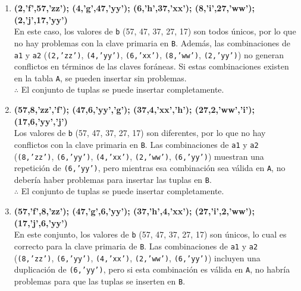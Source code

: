 \begin{enumerate}
    \item \textbf{(2,’f’,57,’zz’); (4,’g’,47,’yy’); (6,’h’,37,’xx’); (8,’i’,27,’ww’); (2,’j’,17,’yy’)} \\
    
    En este caso, los valores de \texttt{b} (57, 47, 37, 27, 17) son todos únicos, por lo que no hay problemas con la clave primaria en \texttt{B}. Además, las combinaciones de \texttt{a1} y \texttt{a2} (\texttt{(2,'zz')}, \texttt{(4,'yy')}, \texttt{(6,'xx')}, \texttt{(8,'ww')}, \texttt{(2,'yy')}) no generan conflictos en términos de las claves foráneas. Si estas combinaciones existen en la tabla \texttt{A}, se pueden insertar sin problemas. \\
    
    $\therefore$ El conjunto de tuplas se puede insertar completamente. \\

    \item \textbf{(57,8,’zz’,’f’); (47,6,’yy’,’g’); (37,4,’xx’,’h’); (27,2,’ww’,’i’); (17,6,’yy’,’j’)} \\
    
    Los valores de \texttt{b} (57, 47, 37, 27, 17) son diferentes, por lo que no hay conflictos con la clave primaria en \texttt{B}. Las combinaciones de \texttt{a1} y \texttt{a2} (\texttt{(8,'zz')}, \texttt{(6,'yy')}, \texttt{(4,'xx')}, \texttt{(2,'ww')}, \texttt{(6,'yy')}) muestran una repetición de \texttt{(6,'yy')}, pero mientras esa combinación sea válida en \texttt{A}, no debería haber problemas para insertar las tuplas en \texttt{B}. \\

    $\therefore$ El conjunto de tuplas se puede insertar completamente.\\

    \item \textbf{(57,’f’,8,’zz’); (47,’g’,6,’yy’); (37,’h’,4,’xx’); (27,’i’,2,’ww’); (17,’j’,6,’yy’)} \\
    
    En este conjunto, los valores de \texttt{b} (57, 47, 37, 27, 17) son únicos, lo cual es correcto para la clave primaria de \texttt{B}. Las combinaciones de \texttt{a1} y \texttt{a2} (\texttt{(8,'zz')}, \texttt{(6,'yy')}, \texttt{(4,'xx')}, \texttt{(2,'ww')}, \texttt{(6,'yy')}) incluyen una duplicación de \texttt{(6,'yy')}, pero si esta combinación es válida en \texttt{A}, no habría problemas para que las tuplas se inserten en \texttt{B}. \\


\end{enumerate}
